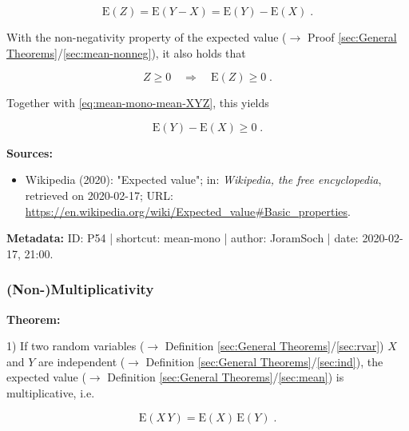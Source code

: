 \documentclass[a4paper,12pt,twoside]{book}
\begin{document}
\begin{equation} \label{eq:mean-mono-mean-XYZ}
\mathrm{E}(Z) = \mathrm{E}(Y-X) = \mathrm{E}(Y) - \mathrm{E}(X) \; .
\end{equation}

With the non-negativity property of the expected value ($\rightarrow$ Proof \ref{sec:General Theorems}/\ref{sec:mean-nonneg}), it also holds that

\begin{equation} \label{eq:mean-mono-mean-Z}
Z \geq 0 \quad \Rightarrow \quad \mathrm{E}(Z) \geq 0 \; .
\end{equation}

Together with \eqref{eq:mean-mono-mean-XYZ}, this yields

\begin{equation} \label{eq:mean-mono-mean-mono-qed}
\mathrm{E}(Y) - \mathrm{E}(X) \geq 0 \; .
\end{equation}


\vspace{1em}
\textbf{Sources:}
\begin{itemize}
\item Wikipedia (2020): "Expected value"; in: \textit{Wikipedia, the free encyclopedia}, retrieved on 2020-02-17; URL: \url{https://en.wikipedia.org/wiki/Expected_value#Basic_properties}.
\end{itemize}


\vspace{1em}
\textbf{Metadata:} ID: P54 | shortcut: mean-mono | author: JoramSoch | date: 2020-02-17, 21:00.
\vspace{1em}



\subsubsection[\textbf{(Non-)Multiplicativity}]{(Non-)Multiplicativity} \label{sec:mean-mult}
\setcounter{equation}{0}

\textbf{Theorem:}

1) If two random variables ($\rightarrow$ Definition \ref{sec:General Theorems}/\ref{sec:rvar}) $X$ and $Y$ are independent ($\rightarrow$ Definition \ref{sec:General Theorems}/\ref{sec:ind}), the expected value ($\rightarrow$ Definition \ref{sec:General Theorems}/\ref{sec:mean}) is multiplicative, i.e.

\begin{equation} \label{eq:mean-mult-mean-mult}
\mathrm{E}(X\,Y) = \mathrm{E}(X) \, \mathrm{E}(Y) \; .
\end{equation}
\end{document}
